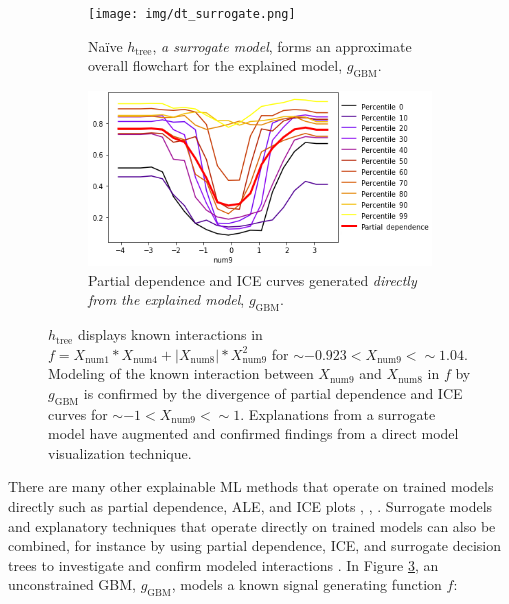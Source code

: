 \documentclass[fleqn]{article}
\begin{document}
\begin{figure}[htb!]
	\begin{subfigure}{.55\textwidth}
		\texttt{[image: img/dt\_surrogate.png]}
  		\caption{Na\"ive $h_{\text{tree}}$, \textit{a surrogate model}, forms an approximate overall flowchart for the explained model, $g_{\text{GBM}}$.}
  		\label{fig:dt_surrogate}
	\end{subfigure}\hspace{5pt}
	\begin{subfigure}{.45\textwidth}
  		\includegraphics[height=.52\linewidth, width=1.02\linewidth]{img/pdp_ice.png}
  		\caption{Partial dependence and ICE curves generated \textit{directly from the explained model}, $g_{\text{GBM}}$.}
  		\label{fig:pdp_ice}
	\end{subfigure}
	\caption{$h_{\text{tree}}$ displays known interactions in $f = X_{\text{num}1} * X_{\text{num}4} + |X_{\text{num}8}| * X_{\text{num}9}^2$ for $\sim -0.923 < X_{\text{num9}} <  \sim 1.04$. Modeling of the known interaction between $X_{\text{num9}}$ and $X_{\text{num8}}$ in $f$ by $g_{\text{GBM}}$ is confirmed by the divergence of partial dependence and ICE curves for $\sim -1 < X_{\text{num9}} <  \sim 1$. Explanations from a surrogate model have augmented and confirmed findings from a direct model visualization technique.}
	\label{fig:pdp_ice_dt_surrogate}
\end{figure}

There are many other explainable ML methods that operate on trained models directly such as partial dependence, ALE, and ICE plots \cite{ale_plot}, \cite{esl}, \cite{ice_plots}. Surrogate models and explanatory techniques that operate directly on trained models can also be combined, for instance by using partial dependence, ICE, and surrogate decision trees to investigate and confirm modeled interactions \cite{art_and_sci}. In Figure \ref{fig:pdp_ice_dt_surrogate}, an unconstrained GBM, $g_{\text{GBM}}$, models a known signal generating function $f$:
\end{document}
